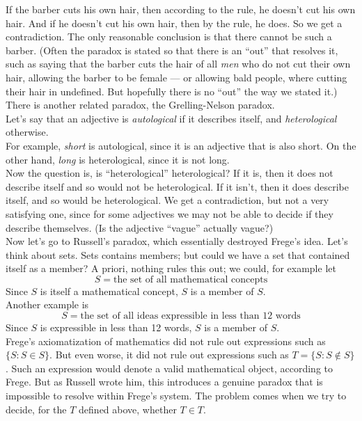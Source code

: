 \documentclass[12pt]{article}
\theoremstyle{plain}
\theoremstyle{definition}
\begin{document}
If the barber cuts his own hair, then according to the rule, he doesn't cut his own hair.
And if he doesn't cut his own hair, then by the rule, he does.
So we get a contradiction.
The only reasonable conclusion is that there cannot be such a barber.
(Often the paradox is stated so that there is an ``out'' that resolves it, such as saying that the barber cuts the hair of all \emph{men} who do not cut their own hair, allowing the barber to be female --- or allowing bald people, where cutting their hair in undefined. But hopefully there is no ``out'' the way we stated it.) \\

There is another related paradox, the Grelling-Nelson paradox. \\
Let's say that an adjective is \emph{autological} if it describes itself, and \emph{heterological} otherwise. \\
For example, \emph{short} is autological, since it is an adjective that is also short.
On the other hand, \emph{long} is heterological, since it is not long. \\

Now the question is, is ``heterological'' heterological?
If it is, then it does not describe itself and so would not be heterological.
If it isn't, then it does describe itself, and so would be heterological.
We get a contradiction, but not a very satisfying one, since for some adjectives we may not be able to decide if they describe themselves.
(Is the adjective ``vague'' actually vague?) \\

Now let's go to Russell's paradox, which essentially destroyed Frege's idea.
Let's think about sets.
Sets contains members; but could we have a set that contained itself as a member?
A priori, nothing rules this out;
we could, for example let
$$S = \text{the set of all mathematical concepts}$$
Since $S$ is itself a mathematical concept, $S$ is a member of $S$. \\
Another example is
$$S = \text{the set of all ideas expressible in less than 12 words}$$
Since $S$ is expressible in less than 12 words, $S$ is a member of $S$. \\

Frege's axiomatization of mathematics did not rule out expressions such as $\{S : S \in S\}$.
But even worse, it did not rule out expressions such as $T = \{S : S \not\in S\}$.
Such an expression would denote a valid mathematical object, according to Frege.
But as Russell wrote him, this introduces a genuine paradox that is impossible to resolve within Frege's system.
The problem comes when we try to decide, for the $T$ defined above, whether $T \in T$. \\
\end{document}
